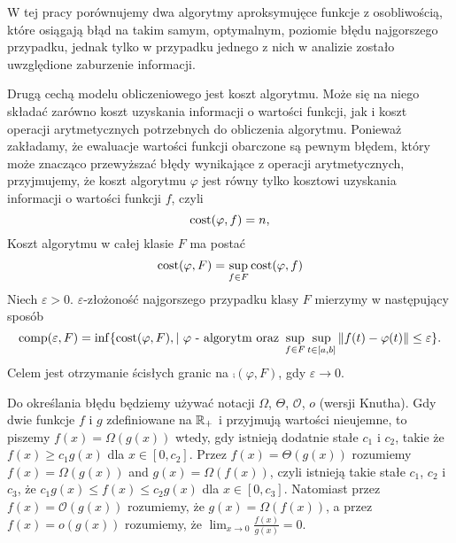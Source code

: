 \documentclass[oik, pdftex, robocza, man]{mgrwms}
\begin{document}
    W tej pracy porównujemy dwa algorytmy aproksymujęce funkcje z osobliwością, które osiągają błąd na takim samym, optymalnym, poziomie błędu najgorszego przypadku, jednak tylko w przypadku jednego z nich w analizie zostało uwzględione zaburzenie informacji.

    Drugą cechą modelu obliczeniowego jest koszt algorytmu. Może się na niego składać zarówno koszt uzyskania informacji o wartości funkcji, jak i koszt operacji arytmetycznych potrzebnych do obliczenia algorytmu. Ponieważ zakładamy, że ewaluacje wartości funkcji obarczone są pewnym błędem, który może znacząco przewyższać błędy wynikające z operacji arytmetycznych, przyjmujemy, że koszt algorytmu $\varphi$ jest równy tylko kosztowi uzyskania informacji o wartości funkcji $f$, czyli
    \begin{equation*}
        \mathrm{cost}(\varphi, f) = n,
    \end{equation*}
    Koszt algorytmu w całej klasie $F$ ma postać
    \begin{equation*}
        \mathrm{cost}(\varphi, F) = \sup_{f \in F} \mathrm{cost}(\varphi, f)
    \end{equation*}
    Niech $\varepsilon > 0$. $\varepsilon$-złożoność najgorszego przypadku klasy $F$ mierzymy w następujący sposób
    \begin{equation*}
        \mathrm{comp}(\varepsilon, F) = \inf \{\mathrm{cost}(\varphi, F), | \text{ $\varphi$ - algorytm oraz } \sup_{f \in F} \sup_{t \in [a,b]} \|f(t) - \varphi(t)\| \leq \varepsilon\}.
    \end{equation*}
    Celem jest otrzymanie ścisłych granic na $\comp(\varphi, F)$, gdy $\varepsilon \rightarrow 0$.

    Do określania błędu będziemy używać notacji $\varOmega$, $\varTheta$, $\mathcal{O}$, $\textit{o}$ (wersji Knutha). Gdy dwie funkcje $f$ i $g$ zdefiniowane na $\mathbb{R}_{+}$ i przyjmują wartości nieujemne, to piszemy $f(x) = \varOmega\left( g(x) \right)$ wtedy, gdy istnieją dodatnie stałe $c_{1}$ i $c_{2}$, takie że $f(x) \geq c_{1} g(x)$ dla $x \in [0, c_{2}]$. Przez $f(x) = \varTheta\left( g(x) \right)$ rozumiemy $f(x) = \varOmega\left( g(x) \right)$ and $g(x) = \varOmega\left( f(x) \right)$, czyli istnieją takie stałe $c_{1}$, $c_{2}$ i $c_{3}$, że $c_{1} g(x) \leq f(x) \leq c_{2} g(x)$ dla $x \in [0, c_{3}]$. Natomiast przez $f(x) = \mathcal{O}(g(x))$ rozumiemy, że $g(x) = \varOmega(f(x))$, a przez $f(x) = \textit{o}(g(x))$ rozumiemy, że $\displaystyle \lim_{x \rightarrow 0} \frac{f(x)}{g(x)} = 0$.
\end{document}
